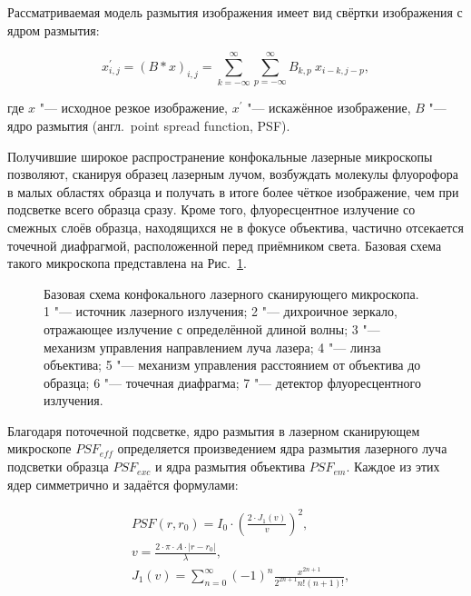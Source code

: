 Рассматриваемая модель размытия изображения имеет вид свёртки изображения с ядром размытия:

\begin{equation*}
	x^\prime_{i,j} = \left(B \ast x\right)_{i,j} = \sum_{k=-\infty}^{\infty} \sum_{p=-\infty}^{\infty}{B_{k,p}\ x_{i-k,j-p}},
\end{equation*}

\noindent где $x$ "--- исходное резкое изображение, $x^\prime$ "--- искажённое изображение, $B$ "--- ядро размытия (англ.~point spread function, PSF).

Получившие широкое распространение конфокальные лазерные микроскопы позволяют, сканируя образец лазерным лучом, возбуждать молекулы флуорофора в малых областях образца и получать в итоге более чёткое изображение, чем  при подсветке всего образца сразу. Кроме того, флуоресцентное излучение со смежных слоёв образца, находящихся не в фокусе объектива, частично отсекается точечной диафрагмой, расположенной перед приёмником света. Базовая схема такого микроскопа представлена на Рис.~\ref{fig:sinopsis-scanning-microscope-scheme}.

\begin{figure}[ht]
	\caption{Базовая схема конфокального лазерного сканирующего микроскопа. 1 "--- источник лазерного излучения; 2 "--- дихроичное зеркало, отражающее излучение с определённой длиной волны; 3 "--- механизм управления направлением луча лазера; 4 "--- линза объектива; 5 "--- механизм управления расстоянием от объектива до образца; 6 "--- точечная диафрагма; 7 "--- детектор флуоресцентного излучения.}
	\label{fig:sinopsis-scanning-microscope-scheme}
\end{figure}

Благодаря поточечной подсветке, ядро размытия в лазерном сканирующем микроскопе $PSF_{eff}$ определяется произведением ядра размытия лазерного луча подсветки образца $PSF_{exc}$ и ядра размытия объектива $PSF_{em}$.
Каждое из этих ядер симметрично и задаётся формулами:

\begin{align*}
	&PSF\left(r, r_0\right) = I_0 \cdot \left(\frac{2\cdot J_1\left(v\right)}{v}\right)^2, \\
	&v=\frac{2\cdot\pi\cdot A\cdot\left|r-r_0\right|}{\lambda}, \\
	&J_1(v)=\sum_{n=0}^{\infty}{\left(-1\right)^n\frac{x^{2n+1}}{2^{2n+1}n!\left(n+1\right)!}},
\end{align*}

